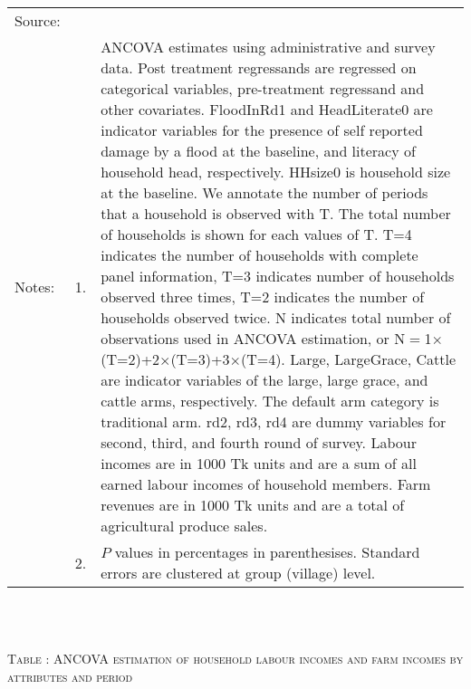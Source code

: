 \begin{minipage}[t]{14cm}
\begin{tabular}{>{\hfill\scriptsize}p{1cm}<{}>{\hfill\scriptsize}p{.25cm}<{}>{\scriptsize}p{12cm}<{\hfill}}
Source:& \multicolumn{2}{l}{\scriptsize Estimated with GUK administrative and survey data.}\\
Notes: & 1. & ANCOVA estimates using administrative and survey data. Post treatment regressands are regressed on categorical variables, pre-treatment regressand and other covariates. \textsf{FloodInRd1} and \textsf{HeadLiterate0} are indicator variables for the presence of self reported damage by a flood at the baseline, and literacy of household head, respectively. \textsf{HHsize0} is household size at the baseline. We annotate the number of periods that a household is observed with \textsf{T}. The total number of households is shown for each values of \textsf{T}. \textsf{T=4} indicates the number of households with complete panel information, \textsf{T=3} indicates number of households observed three times, \textsf{T=2} indicates the number of households observed twice. \textsf{N} indicates total number of observations used in ANCOVA estimation, or \textsf{N$=$1$\times$(T=2)+2$\times$(T=3)+3$\times$(T=4)}.  \textsf{Large}, \textsf{LargeGrace}, \textsf{Cattle} are indicator variables of the \textsf{large}, \textsf{large grace}, and \textsf{cattle} arms, respectively. The default arm category is \textsf{traditional} arm. \textsf{rd2, rd3, rd4} are dummy variables for second, third, and fourth round of survey. Labour incomes are in 1000 Tk units and are a sum of all earned labour incomes of household members. Farm revenues are in 1000 Tk units and are a total of agricultural produce sales. \\
& 2. & $P$ values in percentages in parenthesises. Standard errors are clustered at group (village) level. %
 \end{tabular}
\end{minipage} \\\\\hspace{-1cm}\begin{minipage}[t]{14cm} \hfil\textsc{\normalsize Table \thetable: ANCOVA estimation of household labour incomes and farm incomes by attributes and period\label{tab ANCOVA labour incomes timevarying attributes}}\\ \setlength{\tabcolsep}{1pt}
  \setlength{\baselineskip}{8pt}
  \renewcommand{\arraystretch}{.55}
  \hfil{}
\end{minipage}
